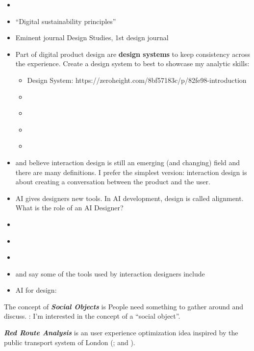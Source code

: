 \documentclass[
  letterpaper,
  DIV=11,
  numbers=noendperiod]{scrartcl}
\providecommand{\tightlist}{%
  \setlength{\itemsep}{0pt}\setlength{\parskip}{0pt}}\usepackage{longtable,booktabs,array}
\begin{document}
\begin{itemize}
\tightlist
\item
  \citet{koningsHowPrepareYour2020}
\item
  ``Digital sustainability principles''
\item
  Eminent journal Design Studies, 1st design journal
\item
  Part of digital product design are \textbf{design systems} to keep
  consistency across the experience. Create a design system to best to
  showcase my analytic skills:

  \begin{itemize}
  \tightlist
  \item
    Design System:
    https://zeroheight.com/8bf57183c/p/82fe98-introduction
  \item
    \citet{ComprehensiveGuideDesign}
  \item
    \citet{suarezDesignSystemsHandbook}
  \item
    \citet{MethodPodcastEpisode}
  \item
    \citet{AtomicDesignBrad}
  \end{itemize}
\item
  \citet{kolkoThoughtsInteractionDesign2010} and
  \citet{ixdfWhatInteractionDesign} believe interaction design is still
  an emerging (and changing) field and there are many definitions. I
  prefer the simplest version: interaction design is about creating a
  conversation between the product and the user.
\item
  AI gives designers new tools. In AI development, design is called
  alignment. What is the role of an AI Designer?
  \citet{lindenWhatRoleAI2021}
\item
  \citet{PeopleAIGuidebook}
\item
  \citet{LanguageModelSketchbook}
\item
  \citet{parundekarEssentialGuideCreating2021}
\item
  \citet{richardyangInteractionDesignMore2021} and
  \citet{justinbakerRedRoutesCritical2018} say some of the tools used by
  interaction designers include
\item
  AI for design: \citet{figmaAINextChapter2023}
\end{itemize}

The concept of \textbf{\emph{Social Objects}} is People need something
to gather around and discuss. \citet{labWhatSocialObject2015}: I'm
interested in the concept of a ``social object''.

\textbf{\emph{Red Route Analysis}} is an user experience optimization
idea inspired by the public transport system of London
(\citet{oviyamtmRedRouteApplication2019};
\citet{InteractionDesignHow2021} and
\citet{xuanHowPrioritiseProduct2022}).
\end{document}

